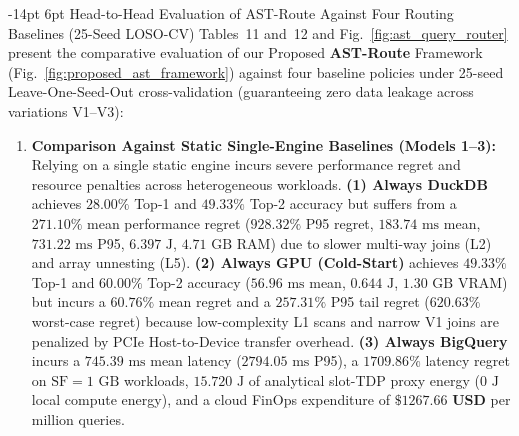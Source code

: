 \documentclass[10pt,a4paper]{article}
\makeatletter
\renewcommand\subsection{\@startsection{subsection}{2}{\z@}%
  {-14pt \@plus -3pt \@minus -1.5pt}%
  {6pt \@plus 1.5pt}%
  {\normalfont\normalsize\bfseries}}
\makeatother
\begin{document}
\subsection{Head-to-Head Evaluation of AST-Route Against Four Routing Baselines (25-Seed LOSO-CV)}
Tables~11 and~12 and Fig.~\ref{fig:ast_query_router} present the comparative evaluation of our Proposed \textbf{AST-Route} Framework (Fig.~\ref{fig:proposed_ast_framework}) against four baseline policies under 25-seed Leave-One-Seed-Out cross-validation (guaranteeing zero data leakage across variations V1--V3):
\begin{enumerate}[leftmargin=1.5em,itemsep=2pt]
    \item \textbf{Comparison Against Static Single-Engine Baselines (Models 1--3):} Relying on a single static engine incurs severe performance regret and resource penalties across heterogeneous workloads. \textbf{(1) Always DuckDB} achieves $28.00\%$ Top-1 and $49.33\%$ Top-2 accuracy but suffers from a $\mathbf{271.10\%}$ mean performance regret ($928.32\%$ P95 regret, $183.74\text{ ms}$ mean, $731.22\text{ ms}$ P95, $6.397\text{ J}$, $4.71\text{ GB}$ RAM) due to slower multi-way joins (L2) and array unnesting (L5). \textbf{(2) Always GPU (Cold-Start)} achieves $49.33\%$ Top-1 and $60.00\%$ Top-2 accuracy ($56.96\text{ ms}$ mean, $0.644\text{ J}$, $1.30\text{ GB}$ VRAM) but incurs a $\mathbf{60.76\%}$ mean regret and a $\mathbf{257.31\%}$ P95 tail regret ($620.63\%$ worst-case regret) because low-complexity L1 scans and narrow V1 joins are penalized by PCIe Host-to-Device transfer overhead. \textbf{(3) Always BigQuery} incurs a $745.39\text{ ms}$ mean latency ($2794.05\text{ ms}$ P95), a $\mathbf{1709.86\%}$ latency regret on $\text{SF}=1\text{ GB}$ workloads, $15.720\text{ J}$ of analytical slot-TDP proxy energy ($0\text{ J}$ local compute energy), and a cloud FinOps expenditure of $\mathbf{\$1267.66\text{ USD}}$ per million queries.

\end{enumerate}
\end{document}
